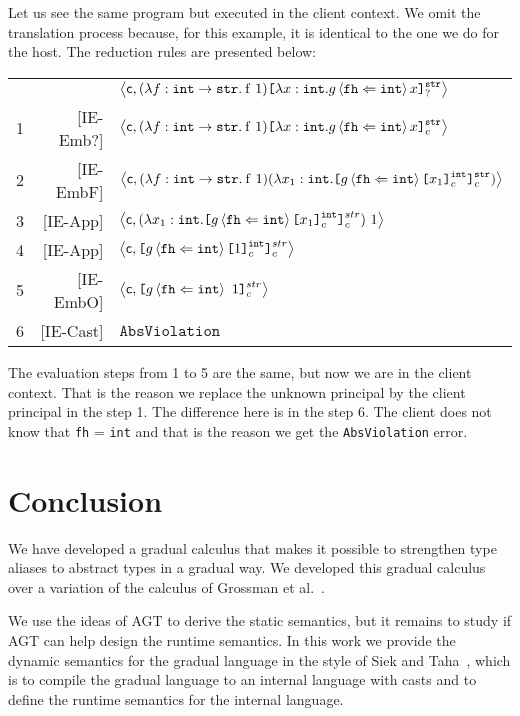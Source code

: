 \documentclass{article}
\newcommand{\emb}[3]{\texttt{[}#1\texttt{]}_{#2}^{#3}}
\newcommand{\tslam}[3]{\lambda #1 : #2. \: #3}
\newcommand{\eval}[2]{\left\langle {#1},{#2} \right\rangle}
\newcommand{\knows}[2]{\left\langle #1 \Leftarrow #2 \right\rangle}
\newcommand\icode[1]{\texttt{#1}}
\newcommand\irname[1]{[#1]}
\begin{document}
Let us see the same program but executed in the {\sf client} context. We omit the translation process because, for this example, it is identical to the one we do for the {\sf host}. The reduction rules are presented below:
\begin{center}
\begin{tabular}{r r l}
& & $\eval{{\sf c}}{(\tslam{f}{\icode{int} \rightarrow \icode{str}}{\mathrm{f~1}})\emb{\lambda x:\icode{int}.g \knows{\icode{fh}}{\icode{int}}x}{?}{\icode{str}}}$\\
1&\irname{IE-Emb?}& $\eval{{\sf c}}{(\tslam{f}{\icode{int} \rightarrow \icode{str}}{\mathrm{f~1}})
                   \emb{\lambda x:\icode{int}.g \knows{\icode{fh}}{\icode{int}}x}{c}{\icode{str}}}$\\
2&\irname{IE-EmbF}& $\eval{{\sf c}}{(\tslam{f}{\icode{int} \rightarrow \icode{str}}{\mathrm{f~1}})
                   (\lambda x_1:\icode{int}.\emb{g \knows{\icode{fh}}{\icode{int}}\emb{x_1}{c}{\icode{int}}}{c}{\icode{str}})}$\\
3&\irname{IE-App}  & $\eval{\sf c}{(\lambda x_1:\icode{int}.\emb{g \knows{\icode{fh}}{\icode{int}}\emb{x_1}{c}{\icode{int}}}{c}{str})~1}$\\
4&\irname{IE-App}  & $\eval{\sf c}{\emb{g \knows{\icode{fh}}{\icode{int}}\emb{1}{c}{\icode{int}}}{c}{str}}$ \\
5&\irname{IE-EmbO} & $\eval{\sf c}{\emb{g \knows{\icode{fh}}{\icode{int}}~1}{c}{str}}$ \\
6&\irname{IE-Cast} & $\icode{AbsViolation}$ 
\end{tabular}
\end{center}

The evaluation steps from 1 to 5 are the same, but now we are in the {\sf client} context. That is the reason we replace the unknown principal by the {\sf client} principal in the step 1. The difference here is in the step 6. The {\sf client} does not know that \icode{fh} = \icode{int} and that is the reason we get the \icode{AbsViolation} error.


\section{Conclusion}
We have developed a gradual calculus that makes it possible to strengthen type aliases to abstract types in a gradual way. We developed this gradual calculus over a variation of the calculus of Grossman et al.~\cite{grossmanAl:toplas2000}. 

We use the ideas of AGT to derive the static semantics, but it remains to study if AGT can help design the runtime semantics. In this work we provide the dynamic semantics for the gradual language in the style of Siek and Taha~\cite{siekTaha:sfp2006}, which is to compile the gradual language to an internal language with casts and to define the runtime semantics for the internal language. 
\end{document}
